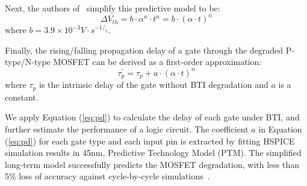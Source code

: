 Next, the authors of~\cite{wang2007efficient} simplify this predictive model to be:
\begin{equation}
\label{eq:dtv2}
\Delta V_{th}=b\cdot  \alpha^n \cdot t^n = b \cdot \left(\alpha \cdot t \right)^n
\end{equation}
where $b = 3.9 \times 10^{-3} V \cdot s^{-1/_5}$.

Finally, the rising/falling propagation delay of a gate through the degraded P-type/N-type MOSFET can be derived as a first-order approximation:
\begin{equation}
\label{eq:pd}
\tau_p^\prime = \tau_p + a \cdot \left(\alpha \cdot  t\right)^n
\end{equation}
where $\tau_p$ is the intrinsic delay of the gate without BTI degradation and $a$ is a constant.

We apply Equation (\ref{eq:pd}) to calculate the delay of each gate under BTI, and further estimate the performance of a logic circuit. The coefficient $a$ in Equation (\ref{eq:pd}) for each gate type and each input pin is extracted by fitting HSPICE simulation results in 45nm, Predictive Technology Model (PTM). The simplified long-term model successfully predicts the MOSFET degradation, with less than 5\% loss of accuracy against cycle-by-cycle simulations~\cite{wang2010impact}.



